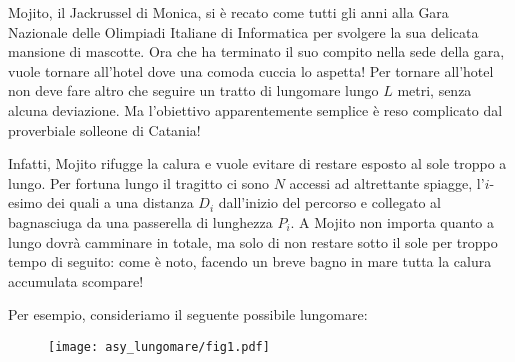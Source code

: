 \usepackage{xcolor}
\usepackage{afterpage}
\usepackage{pifont,mdframed}
\usepackage[bottom]{footmisc}

\usepackage{amsmath}
\usepackage{amsthm}
\usepackage{amssymb}
\usepackage{mathtools}



\newcommand{\inputfile}{\texttt{stdin}}
\newcommand{\outputfile}{\texttt{stdout}}

\newenvironment{warning}
  {\par\begin{mdframed}[linewidth=2pt,linecolor=gray]%
    \begin{list}{}{\leftmargin=1cm
                   \labelwidth=\leftmargin}\item[\Large\ding{43}]}
  {\end{list}\end{mdframed}\par}



	Mojito, il Jackrussel di Monica, si è recato come tutti gli anni alla Gara Nazionale delle Olimpiadi Italiane di Informatica per svolgere la sua delicata mansione di mascotte. Ora che ha terminato il suo compito nella sede della gara, vuole tornare all'hotel dove una comoda cuccia lo aspetta! Per tornare all'hotel non deve fare altro che seguire un tratto di lungomare lungo $L$ metri, senza alcuna deviazione. Ma l'obiettivo apparentemente semplice è reso complicato dal proverbiale solleone di Catania!
	
	Infatti, Mojito rifugge la calura e vuole evitare di restare esposto al sole troppo a lungo. Per fortuna lungo il tragitto ci sono $N$ accessi ad altrettante spiagge, l'$i$-esimo dei quali a una distanza $D_i$ dall'inizio del percorso e collegato al bagnasciuga da una passerella di lunghezza $P_i$. A Mojito non importa quanto a lungo dovrà camminare in totale, ma solo di non restare sotto il sole per troppo tempo di seguito: come è noto, facendo un breve bagno in mare tutta la calura accumulata scompare!
	
	Per esempio, consideriamo il seguente possibile lungomare:
	\begin{figure}[!h]
	\centering
	\texttt{[image: asy\_lungomare/fig1.pdf]}
	\end{figure}
	
